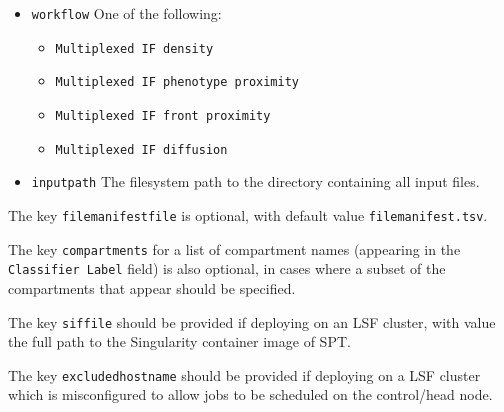 \documentclass[14pt]{article}
\begin{document}
\begin{itemize}
  \itemsep0em
  \item[]{ \colorbox{yellow!25}{\texttt{workflow}} One of the following: \begin{itemize}\itemsep0em\item[]{\colorbox{gray!20}{\texttt{Multiplexed IF density}}} \item[]{\colorbox{gray!20}{\texttt{Multiplexed IF phenotype proximity}}} \item[]{\colorbox{gray!20}{\texttt{Multiplexed IF front proximity}}} \item[]{\colorbox{gray!20}{\texttt{Multiplexed IF diffusion}}} \end{itemize}}
  \item[]{ \colorbox{yellow!25}{\texttt{input{\textunderscore}path}} The filesystem path to the directory containing all input files.}
\end{itemize}

The key \colorbox{yellow!25}{\texttt{file{\textunderscore}manifest{\textunderscore}file}} is optional, with default value \colorbox{gray!20}{\texttt{file{\textunderscore}manifest.tsv}}.

The key \colorbox{yellow!25}{\texttt{compartments}} for a list of compartment names (appearing in the \colorbox{yellow!25}{\texttt{Classifier Label}} field) is also optional, in cases where a subset of the compartments that appear should be specified.

The key \colorbox{yellow!25}{\texttt{sif{\textunderscore}file}} should be provided if deploying on an LSF cluster, with value the full path to the Singularity container image of SPT.

The key \colorbox{yellow!25}{\texttt{excluded{\textunderscore}host{\textunderscore}name}} should be provided if deploying on a LSF cluster which is misconfigured to allow jobs to be scheduled on the control/head node.
\end{document}
